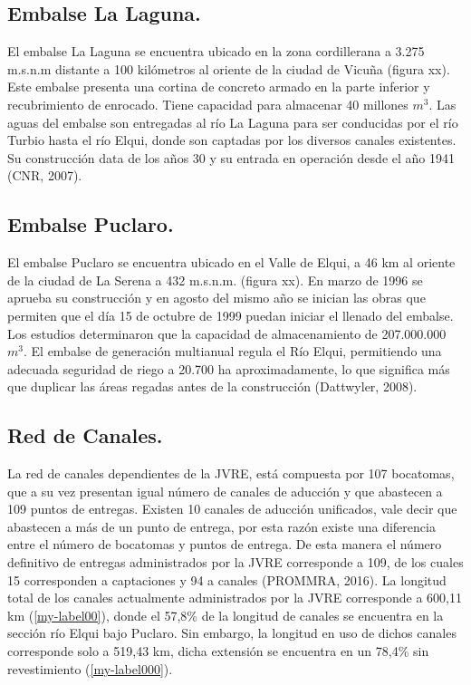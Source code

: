 \documentclass[11pt,]{article}
\begin{document}
\subsection{Embalse La Laguna.} %
El embalse La Laguna se encuentra ubicado en la zona cordillerana a 3.275 m.s.n.m distante a 100 kilómetros al oriente de la ciudad de Vicuña (figura xx). Este embalse presenta una cortina de concreto armado en la parte inferior y recubrimiento de enrocado. Tiene capacidad para almacenar 40 millones $m^3$. Las aguas del embalse son entregadas al río La Laguna para ser conducidas por el río Turbio hasta el río Elqui, donde son captadas por los diversos canales existentes. Su construcción data de los años 30 y su entrada en operación desde el año 1941  (CNR, 2007).

\subsection{Embalse Puclaro.}%
El embalse Puclaro se encuentra ubicado en el Valle de Elqui, a 46 km al oriente de la ciudad de La Serena a 432 m.s.n.m. (figura xx).
En marzo de 1996 se aprueba su construcción y en agosto del mismo año se inician las obras que permiten que el día 15 de octubre de 1999 puedan iniciar el llenado del embalse. Los estudios determinaron que la capacidad de almacenamiento de 207.000.000 $m^3$.
El embalse de generación multianual regula el Río Elqui, permitiendo una adecuada seguridad de riego a 20.700 ha aproximadamente, lo que significa más que duplicar las áreas regadas antes de la construcción (Dattwyler, 2008).

\subsection{Red de Canales.}
La red de canales dependientes de la JVRE, está compuesta por 107 bocatomas, que a su vez presentan igual número de canales de aducción y que abastecen a 109 puntos de entregas. Existen 10 canales de aducción unificados, vale decir que abastecen a más de un punto de entrega, por esta razón existe una diferencia entre el número de bocatomas y puntos de entrega. De esta manera el número definitivo de entregas administrados por la JVRE corresponde a 109, de los cuales 15 corresponden a captaciones y 94 a canales (PROMMRA, 2016).
La longitud total de los canales actualmente administrados por la JVRE corresponde a 600,11 km (\ref{my-label00}), donde el 57,8\% de la longitud de canales se encuentra en la sección río Elqui bajo Puclaro. Sin embargo, la longitud en uso de dichos canales corresponde solo a  519,43 km, dicha extensión se encuentra en un 78,4\% sin revestimiento (\ref{my-label000}).\\
\end{document}

